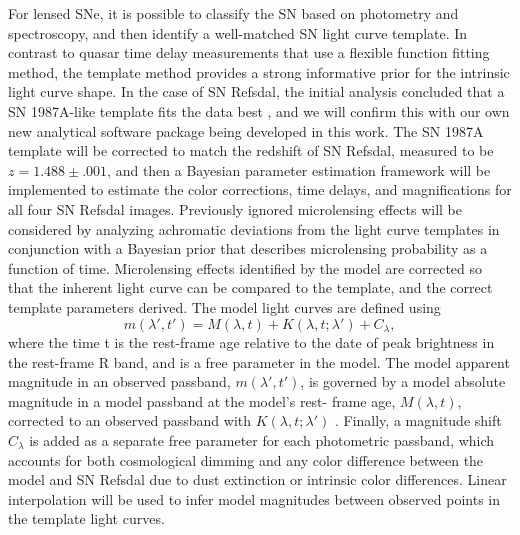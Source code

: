 For lensed SNe, it is possible to classify the SN based on photometry and spectroscopy, and then
identify a well-matched SN light curve template. In contrast to quasar time delay measurements that
use a flexible function fitting method, the template method provides a strong informative prior for the 
intrinsic light curve shape. In the case of SN Refsdal, the initial analysis concluded that a SN 1987A-like
template fits the data best \citep{Kelly:2015c}, and we will confirm this with our own new analytical 
software package being developed in this work. The SN 1987A template will be corrected to match the 
redshift of SN Refsdal, measured to be $z=1.488\pm.001$\citep{Rodney:2016}, and then a Bayesian
parameter estimation framework will be implemented to estimate the color corrections, time delays, and
magnifications for all four SN Refsdal images. Previously ignored microlensing effects will be considered
by analyzing achromatic deviations from the light curve templates in conjunction with a Bayesian prior 
that describes microlensing probability as a function of time. Microlensing effects identified by the model 
are corrected so that the inherent light curve can be compared to the template, and the correct template
parameters derived. The model light curves are defined using
\begin{equation}
m(\lambda',t')=M(\lambda,t)+K(\lambda,t;\lambda')+C_\lambda,
\end{equation}
where the time t is the rest-frame age relative to the date of peak brightness in the rest-frame R band, 
and is a free parameter in the model. The model apparent magnitude in an observed passband,
$m(\lambda',t')$, is governed by a model absolute magnitude in a model passband at the model's rest-
frame age, $M(\lambda,t)$, corrected to an observed passband with $K(\lambda,t;\lambda')$ 
\citep{Strolger:2015}. Finally, a magnitude shift $C_\lambda$ is added as a separate free parameter
for each photometric passband, which accounts for both cosmological dimming and any color difference
between the model and SN Refsdal due to dust extinction or intrinsic color differences. Linear interpolation
will be used to infer model magnitudes between observed points in the template light curves.

